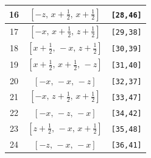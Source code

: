 \documentclass[fleqn,8pt]{jsarticle}
\begin{document}
\begin{longtable}{ccc}
16 & $\left[ - z,\, x + \frac{1}{2},\, x + \frac{1}{2} \right]$ & {\tt [28,46]} \\ \hline
17 & $\left[ - x,\, x + \frac{1}{2},\, z + \frac{1}{2} \right]$ & {\tt [29,38]} \\ \hline
18 & $\left[ x + \frac{1}{2},\, - x,\, z + \frac{1}{2} \right]$ & {\tt [30,39]} \\ \hline
19 & $\left[ x + \frac{1}{2},\, x + \frac{1}{2},\, - z \right]$ & {\tt [31,40]} \\ \hline
20 & $\left[ - x,\, - x,\, - z \right]$ & {\tt [32,37]} \\ \hline
21 & $\left[ - x,\, z + \frac{1}{2},\, x + \frac{1}{2} \right]$ & {\tt [33,47]} \\ \hline
22 & $\left[ - x,\, - z,\, - x \right]$ & {\tt [34,42]} \\ \hline
23 & $\left[ z + \frac{1}{2},\, - x,\, x + \frac{1}{2} \right]$ & {\tt [35,48]} \\ \hline
24 & $\left[ - z,\, - x,\, - x \right]$ & {\tt [36,41]} \\
\end{longtable}
\renewcommand{\arraystretch}{1.2}
\end{document}
